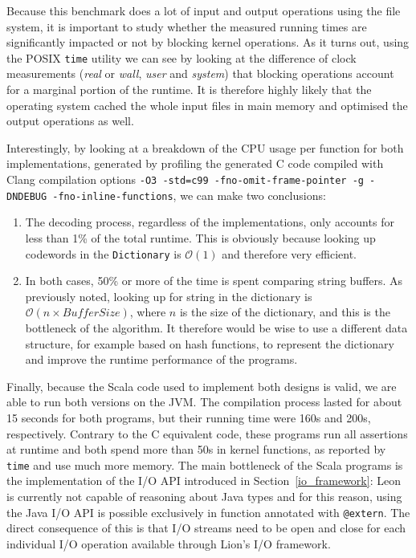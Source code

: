 \documentclass[a4paper,twoside]{article}
\newcommand{\Inline}[1]{\lstinline[basicstyle=\ttfamily]|#1|}
\newcommand{\InlineS}[1]{\lstinline[language=Leon]|#1|}
\newcommand{\RefSec}[1]{Section~\ref{#1}}
\newcommand{\BigO}[1]{\mathcal{O}(#1)}
\begin{document}
Because this benchmark does a lot of input and output operations using the file
system, it is important to study whether the measured running times are
significantly impacted or not by blocking kernel operations. As it turns out,
using the POSIX \Inline{time} utility we can see by looking at the difference of
clock measurements (\emph{real} or \emph{wall}, \emph{user} and \emph{system})
that blocking operations account for a marginal portion of the runtime. It is
therefore highly likely that the operating system cached the whole input files
in main memory and optimised the output operations as well.

Interestingly, by looking at a breakdown of the CPU usage per function for both
implementations, generated by profiling the generated C code compiled with Clang
compilation options \Inline{-O3 -std=c99 -fno-omit-frame-pointer -g -DNDEBUG
-fno-inline-functions}, we can make two conclusions:

\begin{enumerate}

\item The decoding process, regardless of the implementations, only accounts for
less than 1\% of the total runtime. This is obviously because looking up
codewords in the \InlineS{Dictionary} is $\BigO{1}$ and therefore very
efficient.

\item In both cases, 50\% or more of the time is spent comparing string buffers.
As previously noted, looking up for string in the dictionary is $\BigO{n \times
BufferSize}$, where $n$ is the size of the dictionary, and this is the
bottleneck of the algorithm. It therefore would be wise to use a different data
structure, for example based on hash functions, to represent the dictionary and
improve the runtime performance of the programs.

\end{enumerate}

Finally, because the Scala code used to implement both designs is valid, we are
able to run both versions on the JVM. The compilation process lasted for about
15 seconds for both programs, but their running time were 160s and 200s,
respectively. Contrary to the C equivalent code, these programs run all
assertions at runtime and both spend more than 50s in kernel functions, as
reported by \Inline{time} and use much more memory. The main bottleneck of the
Scala programs is the implementation of the I/O API introduced in
\RefSec{io_framework}: Leon is currently not capable of reasoning about Java
types and for this reason, using the Java I/O API is possible exclusively in
function annotated with \InlineS{@extern}. The direct consequence of this is
that I/O streams need to be open and close for each individual I/O operation
available through Lion's I/O framework.
\end{document}
